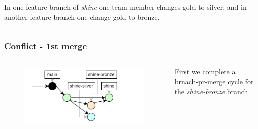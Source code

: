 \documentclass[aspectratio=169]{beamer} %
\begin{document}
\begin{frame}
\begin{columns}[c]
		\vspace{.5cm}
		
		In one feature branch of \textit{shine} one team member changes gold to silver,
		and in another feature branch one change gold to bronze.
			
	\end{columns}
\end{frame}

\begin{frame}
	\frametitle{Conflict - 1st merge}
	\begin{columns}[c]
		
		\vspace{-.6cm}
		\begin{figure}
			\centering
			\includegraphics[width=.9\textwidth]{./img/conflict-network-1stmerge.png}
		\end{figure}
		
		
		First we complete a brnach-pr-merge cycle for the \textit{shine-bronze} branch
		
	\end{columns}
\end{frame}
\end{document}
